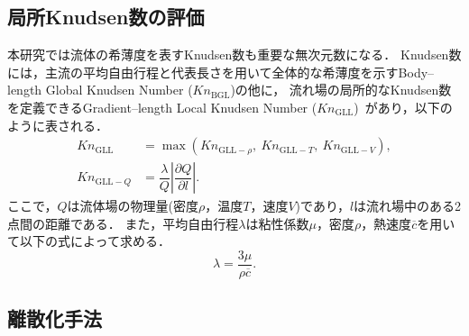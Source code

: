 \subsection{局所Knudsen数の評価}
本研究では流体の希薄度を表すKnudsen数も重要な無次元数になる．
Knudsen数には，主流の平均自由行程と代表長さを用いて全体的な希薄度を示すBody–length Global Knudsen Number ($Kn_\mathrm{BGL}$)の他に，
流れ場の局所的なKnudsen数を定義できるGradient–length Local Knudsen Number ($Kn_\mathrm{GLL}$)~\cite{boyd1995predicting}があり，以下のように表される．
\begin{align}
    Kn_\mathrm{GLL} &= \max(Kn_{\mathrm{GLL}-\rho},\ Kn_{\mathrm{GLL}-T},\ Kn_{\mathrm{GLL}-V}), \\
    Kn_{\mathrm{GLL}-Q} &= \dfrac{\lambda}{Q}\left|\dfrac{\partial Q}{\partial l}\right|.
\end{align}
ここで，$Q$は流体場の物理量(密度$\rho$，温度$T$，速度$V$)であり，$l$は流れ場中のある2点間の距離である．
また，平均自由行程$\lambda$は粘性係数$\mu$，密度$\rho$，熱速度$\overline{c}$を用いて以下の式によって求める．
\begin{equation}
    \lambda = \dfrac{3\mu}{\rho\overline{c}}.
\end{equation}

\subsection{離散化手法}

